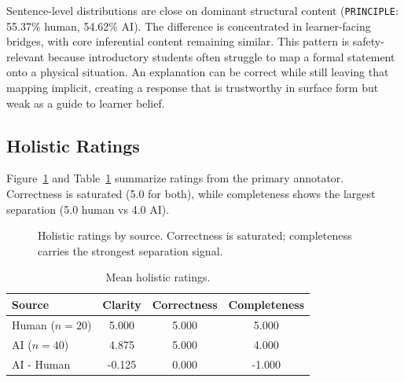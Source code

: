 \documentclass{article}
\begin{document}
Sentence-level distributions are close on dominant structural content (\texttt{PRINCIPLE}: 55.37\% human, 54.62\% AI). The difference is concentrated in learner-facing bridges, with core inferential content remaining similar. This pattern is safety-relevant because introductory students often struggle to map a formal statement onto a physical situation. An explanation can be correct while still leaving that mapping implicit, creating a response that is trustworthy in surface form but weak as a guide to learner belief.

\subsection{Holistic Ratings}
Figure~\ref{fig:ratings} and Table~\ref{tab:ratings} summarize ratings from the primary annotator. Correctness is saturated (5.0 for both), while completeness shows the largest separation (5.0 human vs 4.0 AI).

\begin{figure}[t]
\centering
{}
\caption{Holistic ratings by source. Correctness is saturated; completeness carries the strongest separation signal.}
\label{fig:ratings}
\vspace{-0.9em}
\end{figure}

\begin{table}[t]
\centering
\small
\begin{tabular}{lccc}
\toprule
Source & Clarity & Correctness & Completeness \\
\midrule
Human ($n=20$) & 5.000 & 5.000 & 5.000 \\
AI ($n=40$) & 4.875 & 5.000 & 4.000 \\
AI - Human & -0.125 & 0.000 & -1.000 \\
\bottomrule
\end{tabular}
\caption{Mean holistic ratings.}
\label{tab:ratings}
\vspace{-0.8em}
\end{table}
\end{document}
